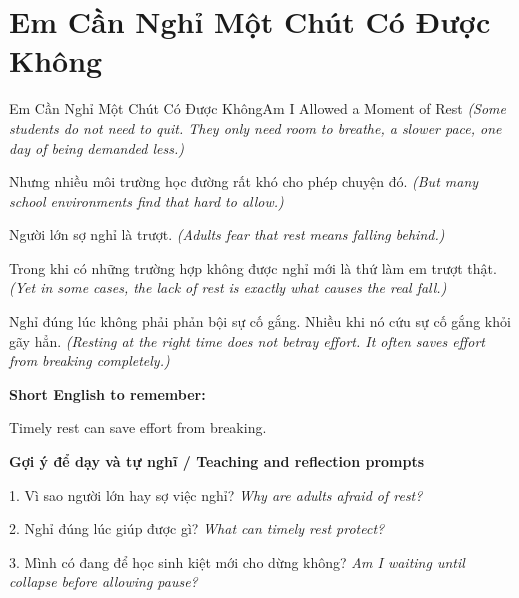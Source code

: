 \section{Em Cần Nghỉ Một Chút Có Được Không}
\begin{truyen}{Em Cần Nghỉ Một Chút Có Được Không}{Am I Allowed a Moment of Rest}
\textit{(Some students do not need to quit. They only need room to breathe, a slower pace, one day of being demanded less.)}

Nhưng nhiều môi trường học đường rất khó cho phép chuyện đó.
\textit{(But many school environments find that hard to allow.)}

Người lớn sợ nghỉ là trượt.
\textit{(Adults fear that rest means falling behind.)}

Trong khi có những trường hợp không được nghỉ mới là thứ làm em trượt thật.
\textit{(Yet in some cases, the lack of rest is exactly what causes the real fall.)}

\end{truyen}

\begin{baihoc}
Nghỉ đúng lúc không phải phản bội sự cố gắng. Nhiều khi nó cứu sự cố gắng khỏi gãy hẳn.
\textit{(Resting at the right time does not betray effort. It often saves effort from breaking completely.)}
\end{baihoc}

\begin{ghinhoanh}
\textbf{Short English to remember:}

Timely rest can save effort from breaking.

\end{ghinhoanh}

\begin{tuhocnhanh}
\textbf{Gợi ý để dạy và tự nghĩ / Teaching and reflection prompts}

1. Vì sao người lớn hay sợ việc nghỉ? \textit{Why are adults afraid of rest?}

2. Nghỉ đúng lúc giúp được gì? \textit{What can timely rest protect?}

3. Mình có đang để học sinh kiệt mới cho dừng không? \textit{Am I waiting until collapse before allowing pause?}
\end{tuhocnhanh}
\ngancach

